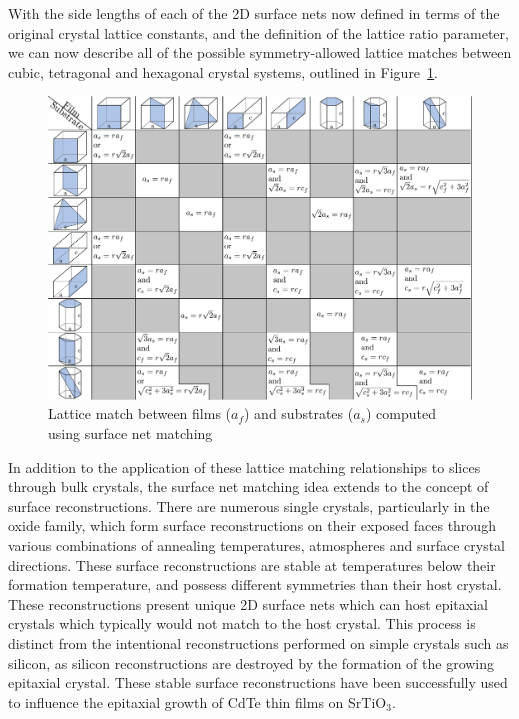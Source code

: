 \documentclass[final,5p,times,twocolumn]{elsarticle}
\begin{document}
With the side lengths of each of the 2D surface nets now defined in terms of the original crystal lattice constants, and the definition of the lattice ratio parameter, we can now describe all of the possible symmetry-allowed lattice matches between cubic, tetragonal and hexagonal crystal systems, outlined in Figure~\ref{fig:match_matrix}.
\begin{figure}
    \includegraphics[width=\textwidth]{graphics/grid2.pdf}
    \caption{Lattice match between films ($a_f$) and substrates ($a_s$) computed using surface net matching\label{fig:match_matrix}}
\end{figure}

In addition to the application of these lattice matching relationships to slices through bulk crystals, the surface net matching idea extends to the concept of surface reconstructions. There are numerous single crystals, particularly in the oxide family, which form surface reconstructions on their exposed faces through various combinations of annealing temperatures, atmospheres and surface crystal directions. These surface reconstructions are stable at temperatures below their formation temperature, and possess different symmetries than their host crystal. These reconstructions present unique 2D surface nets which can host epitaxial crystals which typically would not match to the host crystal. This process is distinct from the intentional reconstructions performed on simple crystals such as silicon, as silicon reconstructions are destroyed by the formation of the growing epitaxial crystal. These stable surface reconstructions have been successfully used to influence the epitaxial growth of CdTe thin films on SrTiO$_3$\cite{Neretina2009a}.
\end{document}

